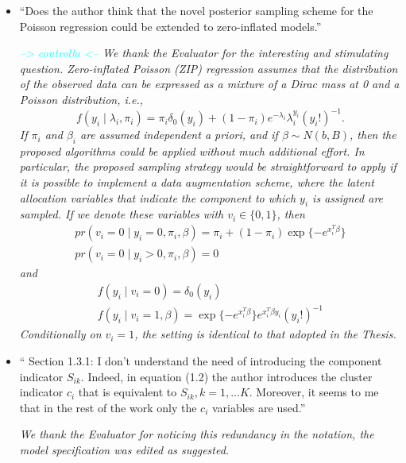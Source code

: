 \documentclass[11pt]{letter}
\begin{document}
\begin{itemize}
%
\item ``Does the author think that the novel posterior sampling scheme for the Poisson regression could be extended to zero-inflated models.''\vskip1mm

{\em 
	\textcolor{cyan}{--> controlla <--}
	We thank the Evaluator for the interesting and stimulating question.
	Zero-inflated Poisson (ZIP) regression assumes that the distribution of the observed data can be expressed as a mixture of a Dirac mass at 0 and a Poisson distribution, i.e.,
	$$ f(y_i \mid \lambda_i, \pi_i) = \pi_i \delta_0(y_i) + (1-\pi_i) e^{-\lambda_i} \lambda_i^{y_i} (y_i!)^{-1}.$$
	If $\pi_i$ and $\beta_i$ are assumed independent a priori, and if $\beta \sim N(b,B)$, then the proposed algorithms could be applied without much additional effort.
	In particular, the proposed sampling strategy would be straightforward to apply if it is possible to implement a data augmentation scheme, where the latent allocation variables that indicate the component to which $y_i$ is assigned are sampled. If we denote these variables with $v_i\in\{0,1\}$, then
	\begin{equation*}
	\begin{gathered}
	pr(v_i = 0 \mid y_i=0, \pi_i, \beta) =  \pi_i + (1-\pi_i) \exp\{-e^{x_i^T\beta}\} \\
	pr(v_i = 0 \mid y_i>0, \pi_i, \beta) =  0
	\end{gathered}
	\end{equation*}
	and
	\begin{equation*}
	\begin{gathered}
		f(y_i \mid v_i = 0) = \delta_0(y_i) \\
		f(y_i \mid v_i = 1, \beta) = \exp\{-e^{x_i^T\beta}\}e^{x_i^T\beta y_i}(y_i!)^{-1}
	\end{gathered}
	\end{equation*}
	Conditionally on $v_i = 1$, the setting is identical to that adopted in the Thesis.
}
\vskip3mm

%
\item `` Section 1.3.1: 
I don't understand the need of introducing the component indicator $S_{ik}$. Indeed, in equation (1.2) the author introduces the cluster indicator $c_i$ that is equivalent to ${S_{ik},k=1,...K}$. Moreover, it seems to me that in the rest of the work only the $c_i$ variables are used.''
\vskip1mm

{\em 
	We thank the Evaluator for noticing this redundancy in the notation, the model specification was edited as suggested.
}
\vskip3mm


\end{itemize}
\end{document}

